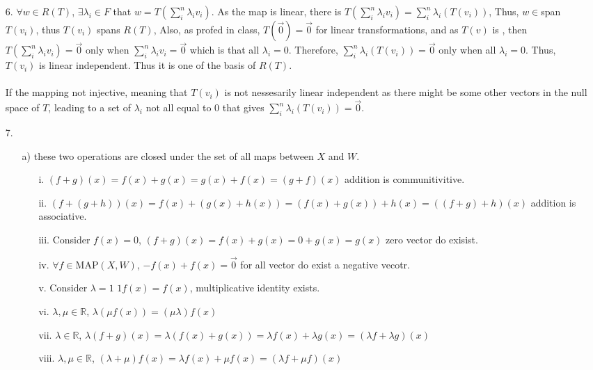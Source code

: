 \documentclass{article}
\begin{document}
\begin{itemize}
    \item[6.] \(\forall w\in R(T)\), \(\exists\lambda_i\in F\) that \(w = T(\sum_i^n\lambda_i v_i)\). As the map is linear,
    there is \(T(\sum_i^n\lambda_i v_i)=\sum_i^n \lambda_i(T(v_i))\), Thus, \(w\in\)span \(T(v_i)\), thus \(T(v_i)\) spans \(R(T)\), Also, as profed in class, \(T(\overrightarrow{0}) = \overrightarrow{0}\) for linear transformations, and as \(T(v)\) is ,
    then \(T(\sum_i^n\lambda_i v_i)=\overrightarrow{0}\) only when \(\sum_i^n\lambda_i v_i = \overrightarrow{0}\) which is that all \(\lambda_i = 0\).
    Therefore, \(\sum_i^n \lambda_i(T(v_i))=\overrightarrow{0}\) only when all \(\lambda_i = 0\). Thus, \(T(v_i)\) is linear independent. Thus it is one of the basis of \(R(T)\). \\ \\ If the mapping not injective,
    meaning that \(T(v_i)\) is not nessesarily linear independent as there might be some other vectors in the null space of \(T\), leading to a set of \(\lambda_i\) not all equal to 0 that gives \(\sum_i^n \lambda_i(T(v_i))=\overrightarrow{0}\).
    \item[7.]
    \begin{itemize}
        \item [a)] these two operations are closed under the set of all maps between \(X\) and \(W\). 
        \begin{itemize}
            \item [i.] \((f+g)(x)=f(x)+g(x)=g(x)+f(x)=(g+f)(x)\) addition is communitivitive.
            \item [ii.] \((f+(g+h))(x)=f(x)+(g(x)+h(x))=(f(x)+g(x))+h(x)=((f+g)+h)(x)\) addition is associative.
            \item [iii.] Consider \(f(x)=0\), \((f+g)(x) = f(x)+g(x)=0+g(x)=g(x)\) zero vector do exisist.
            \item [iv.] \(\forall f \in \)MAP\((X,W)\), \(-f(x)+f(x) = \overrightarrow{0}\) for all vector do exist a negative vecotr.
            \item [v.] Consider \(\lambda = 1\) \(1f(x) = f(x)\), multiplicative identity exists.
            \item [vi.] \(\lambda,\mu\in\mathbb{R}\), \(\lambda(\mu f(x))=(\mu\lambda)f(x)\)
            \item [vii.] \(\lambda\in\mathbb{R}\), \(\lambda(f+g)(x) = \lambda(f(x)+g(x))=\lambda f(x)+\lambda g(x) = (\lambda f+\lambda g)(x)\)
            \item [viii.] \(\lambda,\mu\in\mathbb{R}\), \((\lambda+\mu)f(x) = \lambda f(x)+\mu f(x)= (\lambda f +\mu f)(x)\)

\end{itemize}
\end{itemize}
\end{itemize}
\end{document}
